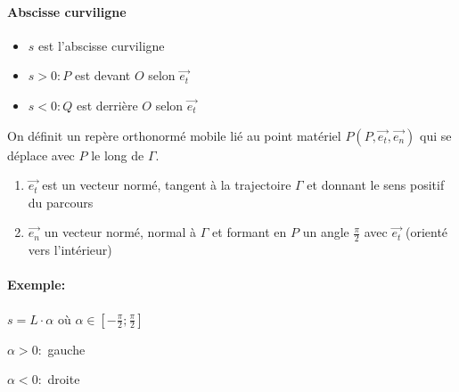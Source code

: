\documentclass[
    11pt,
    a4paper,
    oneside,
    headinlcude, footinclude,
    twoside,
]{report}
\renewcommand{\vec}[1]{\overrightarrow{#1}}
\begin{document}
\paragraph{Abscisse curviligne}
\label{par:abscisse_curviligne}


\begin{center}
    \begin{minipage}{.5\linewidth}
    \end{minipage}
    \begin{minipage}{.49\linewidth}
        \setlength{\parskip}{.3em}
        \begin{itemize}
            \item $s$ est l'abscisse curviligne 
            \item $s > 0: P$ est devant $O$ selon $\vec{e_{t}}$
            \item $s < 0: Q$ est derrière $O$ selon $\vec{e_{t}}$
        \end{itemize}
    \end{minipage}
\end{center}

On définit un repère orthonormé mobile lié au point matériel $P (P, \vec{e_{t}},
\vec{e_{n}})$ qui se déplace avec $P$ le long de $\Gamma$.

\begin{enumerate}
    \item $\vec{e_{t}}$ est un vecteur normé, tangent à la trajectoire $\Gamma$
        et donnant le sens positif du parcours
    \item $\vec{e_{n}}$ un vecteur normé, normal à $\Gamma$ et formant en $P$ un
        angle $\frac{\pi}{2}$ avec $\vec{e_{t}}$ (orienté vers l'intérieur)
\end{enumerate}

\paragraph{Exemple:}

\begin{center}
    \begin{minipage}{.44\linewidth}
    \end{minipage}
    \begin{minipage}{.55\linewidth}
        \setlength{\parskip}{.3em}
        \begin{description}
            \item[Abscisse curviligne:] $s = L \cdot \alpha$ où $\alpha \in
                \left[- \frac{\pi }{2}; \frac{\pi }{2}\right]$
            \item  $\alpha > 0:$ gauche
            \item  $\alpha < 0:$ droite
        \end{description}
    \end{minipage}
\end{center}
\end{document}
